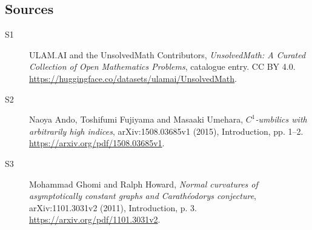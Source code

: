 \documentclass[11pt]{article}
\begin{document}
\subsection{Sources}
\begin{description}
\item[\hypertarget{source:statement:1}{S1}] ULAM.AI and the UnsolvedMath Contributors, \emph{UnsolvedMath: A Curated Collection of Open Mathematics Problems}, catalogue entry. CC BY 4.0. \url{https://huggingface.co/datasets/ulamai/UnsolvedMath}.
\item[\hypertarget{source:statement:2}{S2}] Naoya Ando, Toshifumi Fujiyama and Masaaki Umehara, \emph{$C^1$-umbilics with arbitrarily high indices}, arXiv:1508.03685v1 (2015), Introduction, pp. 1--2. \url{https://arxiv.org/pdf/1508.03685v1}.
\item[\hypertarget{source:statement:3}{S3}] Mohammad Ghomi and Ralph Howard, \emph{Normal curvatures of asymptotically constant graphs and Carath\'eodory\textquotesingle s conjecture}, arXiv:1101.3031v2 (2011), Introduction, p. 3. \url{https://arxiv.org/pdf/1101.3031v2}.
\end{description}
\label{end:statement}
\end{document}
